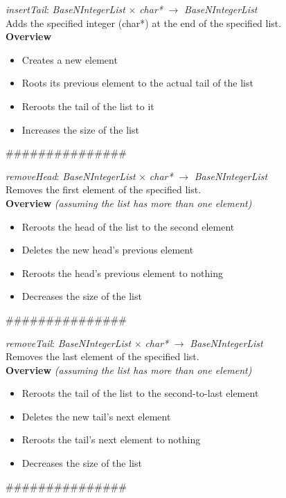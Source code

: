 \documentclass[book, backcover, english, nodocumentinfo]{upmethodology-document}
\newcommand{\nxtalgo}{\centerline{$$$$\#\#\#\#\#\#\#\#\#\#\#\#\#\#\#$$$$}}
\newcommand{\ov}{\textbf{Overview}}
\begin{document}
		\begin{minipage}{\linewidth}
			\textit{insertTail}: \textit{BaseNIntegerList} $\times$ \textit{char*} $\rightarrow$ \textit{BaseNIntegerList}\\
			Adds the specified integer (char*) at the end of the specified list.\\
			\ov
			\begin{itemize}
				\item Creates a new element
				\item Roots its previous element to the actual tail of the list
				\item Reroots the tail of the list to it
				\item Increases the size of the list
			\end{itemize}
			\label{algo:BNIL-InsertTail}
			
		\end{minipage}
		\nxtalgo{}

		\begin{minipage}{\linewidth}
			\textit{removeHead}: \textit{BaseNIntegerList} $\times$ \textit{char*} $\rightarrow$ \textit{BaseNIntegerList}\\
			Removes the first element of the specified list.\\
			\ov \textit{ (assuming the list has more than one element)}
			\begin{itemize}
				\item Reroots the head of the list to the second element
				\item Deletes the new head's previous element
				\item Reroots the head's previous element to nothing
				\item Decreases the size of the list
			\end{itemize}
			\label{algo:BNIL-RemoveHead}
			
		\end{minipage}
		\nxtalgo{}

		\begin{minipage}{\linewidth}
			\textit{removeTail}: \textit{BaseNIntegerList} $\times$ \textit{char*} $\rightarrow$ \textit{BaseNIntegerList}\\
			Removes the last element of the specified list.\\
			\ov \textit{ (assuming the list has more than one element)}
			\begin{itemize}
				\item Reroots the tail of the list to the second-to-last element
				\item Deletes the new tail's next element
				\item Reroots the tail's next element to nothing
				\item Decreases the size of the list
			\end{itemize}
			\label{algo:BNIL-RemoveTail}
			
		\end{minipage}
		\nxtalgo{}
\end{document}

